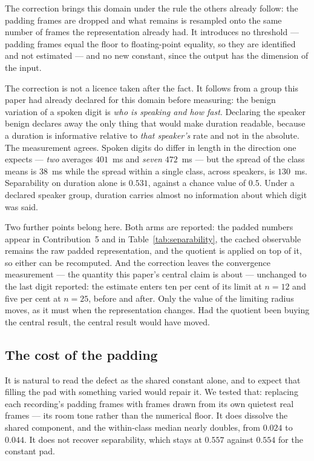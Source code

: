 \documentclass[10pt]{article}
\theoremstyle{plain}
\theoremstyle{definition}
\theoremstyle{remark}
\begin{document}
The correction brings this domain under the rule the others already follow: the
padding frames are dropped and what remains is resampled onto the same number
of frames the representation already had. It introduces no threshold ---
padding frames equal the floor to floating-point equality, so they are
identified and not estimated --- and no new constant, since the output has the
dimension of the input.

The correction is not a licence taken after the fact. It follows from a group
this paper had already declared for this domain before measuring: the benign
variation of a spoken digit is \emph{who is speaking and how fast}. Declaring
the speaker benign declares away the only thing that would make duration
readable, because a duration is informative relative to \emph{that speaker's}
rate and not in the absolute. The measurement agrees. Spoken digits do differ
in length in the direction one expects --- \emph{two} averages $401$~ms and
\emph{seven} $472$~ms --- but the spread of the class means is $38$~ms while the
spread within a single class, across speakers, is $130$~ms. Separability on
duration alone is $0.531$, against a chance value of $0.5$. Under a declared
speaker group, duration carries almost no information about which digit was
said.

Two further points belong here. Both arms are reported: the padded numbers
appear in Contribution~5 and in Table~\ref{tab:separability}, the cached
observable remains the raw padded representation, and the quotient is applied
on top of it, so either can be recomputed. And the correction leaves the
convergence measurement --- the quantity this paper's central claim is about ---
unchanged to the last digit reported: the estimate enters ten per cent of its
limit at $n=12$ and five per cent at $n=25$, before and after. Only the value of
the limiting radius moves, as it must when the representation changes. Had the
quotient been buying the central result, the central result would have moved.

\subsection{The cost of the padding}

It is natural to read the defect as the shared constant alone, and to expect
that filling the pad with something varied would repair it. We tested that:
replacing each recording's padding frames with frames drawn from its own
quietest real frames --- its room tone rather than the numerical floor. It
does dissolve the shared component, and the within-class median nearly doubles,
from $0.024$ to $0.044$. It does not recover separability, which stays at
$0.557$ against $0.554$ for the constant pad.
\end{document}
